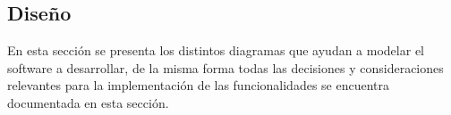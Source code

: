 \clearpage
\subsection{Diseño}

 En esta sección se presenta los distintos diagramas que ayudan a modelar el
 software a desarrollar, de la misma forma todas las decisiones y consideraciones
 relevantes para la implementación de las funcionalidades se encuentra documentada
 en esta sección.

    

\begin{comment} %
\subsubsection{Interfaces de Moodle}









\end{comment}
